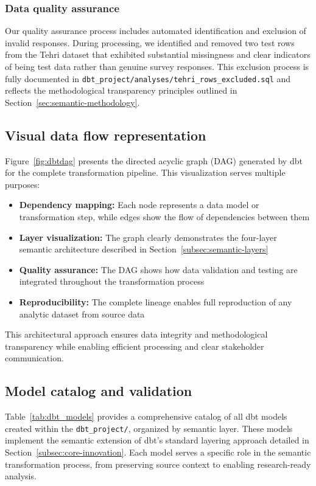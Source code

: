 \documentclass{article}
\begin{document}
\subsubsection{Data quality assurance}

Our quality assurance process includes automated identification and exclusion of invalid responses. During processing, we identified and removed two test rows from the Tehri dataset that exhibited substantial missingness and clear indicators of being test data rather than genuine survey responses. This exclusion process is fully documented in \texttt{dbt\_project/analyses/tehri\_rows\_excluded.sql} and reflects the methodological transparency principles outlined in Section~\ref{sec:semantic-methodology}.

\subsection{Visual data flow representation}

Figure~\ref{fig:dbtdag} presents the directed acyclic graph (DAG) generated by dbt for the complete transformation pipeline. This visualization serves multiple purposes:

\begin{itemize}
    \item \textbf{Dependency mapping:} Each node represents a data model or transformation step, while edges show the flow of dependencies between them
    \item \textbf{Layer visualization:} The graph clearly demonstrates the four-layer semantic architecture described in Section~\ref{subsec:semantic-layers}
    \item \textbf{Quality assurance:} The DAG shows how data validation and testing are integrated throughout the transformation process
    \item \textbf{Reproducibility:} The complete lineage enables full reproduction of any analytic dataset from source data
\end{itemize}

This architectural approach ensures data integrity and methodological transparency while enabling efficient processing and clear stakeholder communication.

\subsection{Model catalog and validation}

Table~\ref{tab:dbt_models} provides a comprehensive catalog of all dbt models created within the \texttt{dbt\_project/}, organized by semantic layer. These models implement the semantic extension of dbt's standard layering approach detailed in Section~\ref{subsec:core-innovation}. Each model serves a specific role in the semantic transformation process, from preserving source context to enabling research-ready analysis.
\end{document}
